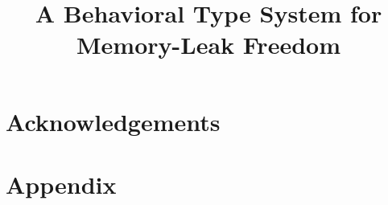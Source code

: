 \documentclass[pageno]{jpaper}
\theoremstyle{definition}
\begin{document}
\title{
A Behavioral Type System for Memory-Leak Freedom}

\date{}
\maketitle

\thispagestyle{empty}









\section{Acknowledgements}




\section*{Appendix}



\end{document}

